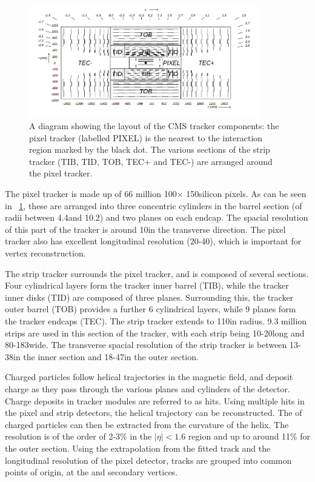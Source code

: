 \begin{figure}[h]
\centering
\includegraphics[width=0.9\textwidth]{detectorFigures/trackerSchematic.png}
\caption{A diagram showing the layout of the CMS tracker components: the pixel tracker (labelled PIXEL) is the nearest to the interaction region marked by the black dot. The various sections of the strip tracker (TIB, TID, TOB, TEC+ and TEC-) are arranged around the pixel tracker. \cite{CMSTDR}}
\label{fig:trk}
\end{figure}

The pixel tracker is made up of 66 million 100\um $\times$ 150\um silicon pixels. As can be seen in \Fig~\ref{fig:trk}, these are arranged into three concentric cylinders in the barrel section (of radii between 4.4\cm and 10.2\cm) and two planes on each endcap. The spacial resolution of this part of the tracker is around 10\um in the transverse direction. The pixel tracker also has excellent longitudinal resolution (20-40\um), which is important for vertex reconstruction.~\cite{trackerperformance2014}

The strip tracker surrounds the pixel tracker, and is composed of several sections. Four cylindrical layers form the tracker inner barrel (TIB), while the tracker inner disks (TID) are composed of three planes. Surrounding this, the tracker outer barrel (TOB) provides a further 6 cylindrical layers, while 9 planes form the tracker endcaps (TEC). The strip tracker extends to 110\cm in radius. 9.3 million strips are used in this section of the tracker, with each strip being 10-20\cm long and 80-183\um wide. The transverse spacial resolution of the strip tracker is between 13-38\um in the inner section and 18-47\um in the outer section.~\cite{trackerperformance2014}

Charged particles follow helical trajectories in the \CMS magnetic field, and deposit charge as they pass through the various planes and cylinders of the detector. Charge deposits in tracker modules are referred to as hits. Using multiple hits in the pixel and strip detectors, the helical trajectory can be reconstructed. The \pT of charged particles can then be extracted from the curvature of the helix. The \pT resolution is of the order of 2-3\% in the $|\eta|<1.6$ region and up to around 11\% for the outer section. Using the extrapolation from the fitted track and the longitudinal resolution of the pixel detector, tracks are grouped into common points of origin, at the \PV and secondary vertices.  

